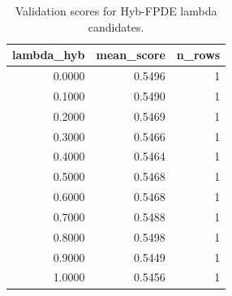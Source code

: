 \begin{table}[t]
\caption{Validation scores for Hyb-FPDE lambda candidates.}
\label{tab:lambda_distribution_computed}
\centering
\begin{tabular}{rrr}
\toprule
lambda\_hyb & mean\_score & n\_rows \\
\midrule
0.0000 & 0.5496 & 1 \\
0.1000 & 0.5490 & 1 \\
0.2000 & 0.5469 & 1 \\
0.3000 & 0.5466 & 1 \\
0.4000 & 0.5464 & 1 \\
0.5000 & 0.5468 & 1 \\
0.6000 & 0.5468 & 1 \\
0.7000 & 0.5488 & 1 \\
0.8000 & 0.5498 & 1 \\
0.9000 & 0.5449 & 1 \\
1.0000 & 0.5456 & 1 \\
\bottomrule
\end{tabular}

\end{table}
